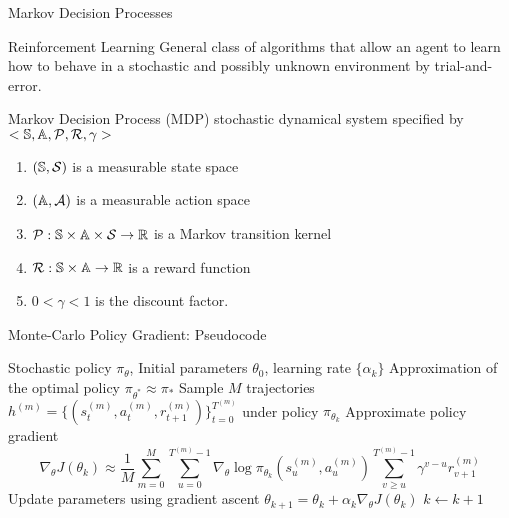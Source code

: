 \begin{frame}{Markov Decision Processes}
	\begin{block}{Reinforcement Learning}
		General class of algorithms that allow an agent to learn how to behave
		in a stochastic and possibly unknown environment by trial-and-error.
	\end{block}
	
	\begin{block}{Markov Decision Process (MDP)}
		stochastic dynamical system specified by $<\mathbb{S}, \mathbb{A}, \mathcal{P}, \mathcal{R}, \gamma>$
		\begin{enumerate}
			\item $(\mathbb{S}, \mathcal{S})$ is a measurable state space
			\item $(\mathbb{A}, \mathcal{A})$ is a measurable action space
			\item $\mathcal{P}: \mathbb{S} \times \mathbb{A} \times \mathcal{S} \to \mathbb{R}$ is a Markov transition kernel
			\item $\mathcal{R}: \mathbb{S} \times \mathbb{A} \to \mathbb{R}$ is a reward function
			\item $0 < \gamma < 1$ is the discount factor.
		\end{enumerate}
	\end{block}
\end{frame}



\begin{frame}{Monte-Carlo Policy Gradient: Pseudocode}
	\begin{algorithmic}[1]
		\Require Stochastic policy $\pi_\theta$, Initial parameters $\theta_0$, learning rate $\{\alpha_k\}$
		\Ensure Approximation of the optimal policy $\pi_{\theta^*} \approx \pi_*$
		\Repeat
			\State Sample $M$ trajectories $h^{(m)} = \{(s_t^{(m)}, a_t^{(m)}, r_{t+1}^{(m)})\}_{t = 0}^{T^{(m)}}$ under policy $\pi_{\theta_k}$   
			\State Approximate policy gradient 
			\begin{equation*}
				\nabla_\theta J(\theta_k) \approx \frac{1}{M} \sum_{m=0}^M
				 \sum_{u=0}^{T^{(m)}-1} \nabla_\theta\log \pi_{\theta_k} \left(s_u^{(m)}, a_u^{(m)}\right) 
				 \sum_{v \geq u}^{T^{(m)}-1} \gamma^{v-u} r_{v+1}^{(m)}   
			\end{equation*}
			\State Update parameters using gradient ascent $\theta_{k+1} = \theta_k + \alpha_k \nabla_\theta J(\theta_k)$
			\State $k \leftarrow k + 1$
	\end{algorithmic}
\end{frame}


